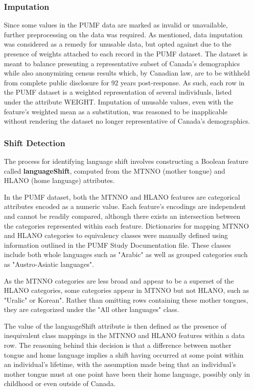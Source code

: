 \documentclass[10pt, conference, compsocconf]{IEEEtran}
\begin{document}
\subsubsection{Imputation}
Since some values in the PUMF data are marked as invalid or unavailable, further preprocessing on the data was required.  As mentioned, data imputation was considered as a remedy for unusable data, but opted against due to the presence of weights attached to each record in the PUMF dataset.  The dataset is meant to balance presenting a representative subset of Canada's demographics while also anonymizing census results which, by Canadian law, are to be withheld from complete public disclosure for 92 years post-response.  As such, each row in the PUMF dataset is a weighted representation of several individuals, listed under the attribute WEIGHT.  Imputation of unusable values, even with the feature's weighted mean as a substitution, was reasoned to be inapplicable without rendering the dataset no longer representative of Canada's demographics.

\subsubsection{Shift Detection}
The process for identifying language shift involves constructing a Boolean feature called \textbf{languageShift}, computed from the MTNNO (mother tongue) and HLANO (home language) attributes.

In the PUMF dataset, both the MTNNO and HLANO features are categorical attributes encoded as a numeric value.  Each feature's encodings are independent and cannot be readily compared, although there exists an intersection between the categories represented within each feature.  Dictionaries for mapping MTNNO and HLANO categories to equivalency classes were manually defined using information outlined in the PUMF Study Documentation file.  These classes include both whole languages such as "Arabic" as well as grouped categories such as "Austro-Asiatic languages".

As the MTNNO categories are less broad and appear to be a superset of the HLANO categories, some categories appear in MTNNO but not HLANO, such as "Uralic" or Korean".  Rather than omitting rows containing these mother tongues, they are categorized under the "All other languages" class.

The value of the languageShift attribute is then defined as the presence of inequivalent class mappings in the MTNNO and HLANO features within a data row.  The reasoning behind this decision is that a difference between mother tongue and home language implies a shift having occurred at some point within an individual's lifetime, with the assumption made being that an individual's mother tongue must at one point have been their home language, possibly only in childhood or even outside of Canada.
\end{document}
